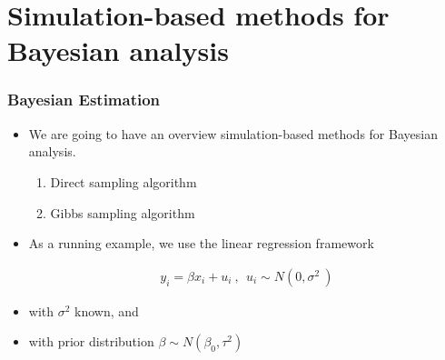 \documentclass[
  shownotes,
  xcolor={svgnames},
  hyperref={colorlinks,citecolor=DarkBlue,linkcolor=DarkRed,urlcolor=DarkBlue}
  , aspectratio=169]{beamer}
\begin{document}
\section{Simulation-based methods for Bayesian analysis}
\begin{frame}[fragile]
\frametitle{Bayesian Estimation}

\begin{itemize}


\item We are going to have an overview simulation-based methods for Bayesian analysis.
\medskip
    \begin{enumerate}
        \item Direct sampling algorithm
        \medskip
        \item Gibbs sampling algorithm
    \end{enumerate}

\medskip
\item As a running example, we use the linear regression framework

\medskip
\begin{align}
y_{i} = \beta x_{i} + u_{i}\ ,\ \ u_{i} \sim N(0, \sigma^{2}\ ) 
\end{align}
\item with $\sigma^{2}$ known, and
\item with prior distribution $\beta \sim N( \beta_{0},  \tau^{2})$

\end{itemize}
\end{frame}
\end{document}
